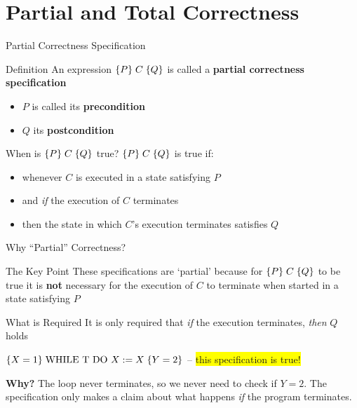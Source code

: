 \section{Partial and Total Correctness}

\begin{frame}{Partial Correctness Specification}
    \begin{block}{Definition}
        An expression $\{P\}\; C\; \{Q\}$ is called a \textbf{partial correctness specification}
        \begin{itemize}
            \item $P$ is called its \textbf{precondition}
            \item $Q$ its \textbf{postcondition}
        \end{itemize}
    \end{block}
    
    \begin{block}{When is $\{P\}\; C\; \{Q\}$ true?}
        $\{P\}\; C\; \{Q\}$ is true if:
        \begin{itemize}
            \item whenever $C$ is executed in a state satisfying $P$
            \item and \emph{if} the execution of $C$ terminates
            \item then the state in which $C$'s execution terminates satisfies $Q$
        \end{itemize}
    \end{block}
\end{frame}

\begin{frame}{Why ``Partial'' Correctness?}
    \begin{block}{The Key Point}
        These specifications are `partial' because for $\{P\}\; C\; \{Q\}$ to be true it is \textbf{not} necessary for the execution of $C$ to terminate when started in a state satisfying $P$
    \end{block}
    
    \begin{block}{What is Required}
        It is only required that \emph{if} the execution terminates, \emph{then} $Q$ holds
    \end{block}
    
    \begin{example}
        $\{X = 1\}\; \text{WHILE T DO } X := X\; \{Y = 2\}$ -- \colorbox{yellow}{this specification is true!}
        
        \textbf{Why?} The loop never terminates, so we never need to check if $Y = 2$. The specification only makes a claim about what happens \emph{if} the program terminates.
    \end{example}
\end{frame}

